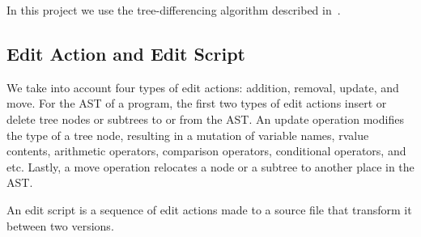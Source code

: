 In this project we use the tree-differencing algorithm described in~\cite{DBLP:conf/kbse/FalleriMBMM14}.

\subsection{Edit Action and Edit Script}

We take into account four types of edit actions: addition, removal, update, and move. For the AST of a program, the first two types of edit actions insert or delete tree nodes or subtrees to or from the AST. An update operation modifies the type of a tree node, resulting in a mutation of variable names, rvalue contents, arithmetic operators, comparison operators, conditional operators, and etc. Lastly, a move operation relocates a node or a subtree to another place in the AST. 

An edit script is a sequence of edit actions made to a source file that transform it between two versions.

